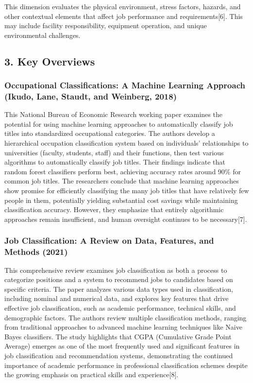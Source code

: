 \documentclass[
  letterpaper,
  DIV=11,
  numbers=noendperiod]{scrartcl}
\begin{document}
This dimension evaluates the physical environment, stress factors,
hazards, and other contextual elements that affect job performance and
requirements{[}6{]}. This may include facility responsibility, equipment
operation, and unique environmental challenges.

\subsection{3. Key Overviews}\label{key-overviews}

\subsubsection{Occupational Classifications: A Machine Learning Approach
(Ikudo, Lane, Staudt, and Weinberg,
2018)}\label{occupational-classifications-a-machine-learning-approach-ikudo-lane-staudt-and-weinberg-2018}

This National Bureau of Economic Research working paper examines the
potential for using machine learning approaches to automatically
classify job titles into standardized occupational categories. The
authors develop a hierarchical occupation classification system based on
individuals' relationships to universities (faculty, students, staff)
and their functions, then test various algorithms to automatically
classify job titles. Their findings indicate that random forest
classifiers perform best, achieving accuracy rates around 90\% for
common job titles. The researchers conclude that machine learning
approaches show promise for efficiently classifying the many job titles
that have relatively few people in them, potentially yielding
substantial cost savings while maintaining classification accuracy.
However, they emphasize that entirely algorithmic approaches remain
insufficient, and human oversight continues to be necessary{[}7{]}.

\subsubsection{Job Classification: A Review on Data, Features, and
Methods
(2021)}\label{job-classification-a-review-on-data-features-and-methods-2021}

This comprehensive review examines job classification as both a process
to categorize positions and a system to recommend jobs to candidates
based on specific criteria. The paper analyzes various data types used
in classification, including nominal and numerical data, and explores
key features that drive effective job classification, such as academic
performance, technical skills, and demographic factors. The authors
review multiple classification methods, ranging from traditional
approaches to advanced machine learning techniques like Naive Bayes
classifiers. The study highlights that CGPA (Cumulative Grade Point
Average) emerges as one of the most frequently used and significant
features in job classification and recommendation systems, demonstrating
the continued importance of academic performance in professional
classification schemes despite the growing emphasis on practical skills
and experience{[}8{]}.
\end{document}

